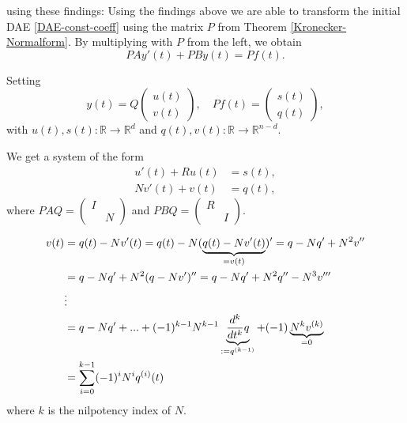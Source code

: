	\begin{frame}
		using these findings:
		Using the findings above we are able to transform the initial DAE \eqref{DAE-const-coeff} using the matrix $P$ from Theorem \ref{Kronecker-Normalform}. By multiplying with $P$ from the left, we obtain
		\begin{displaymath}
			P A y'(t) + P B y(t) = P f(t) .
		\end{displaymath}
		
		Setting
		\begin{displaymath}
			y(t) = Q
			\left(
			\begin{matrix}
				u(t) \\
				v(t)
			\end{matrix}  
			\right) 
			, \quad
			Pf(t) = 
			\left(
			\begin{matrix}
				s(t) \\
				q(t)
			\end{matrix}
			\right),
		\end{displaymath}
		with $u(t),s(t) : \mathbb{R} \to \mathbb{R}^d$ and $q(t),v(t) : \mathbb{R} \to \mathbb{R}^{n-d}$.
		
		We get a system of the form
		\begin{equation}
			\label{transformed-DAE-const-coeff}
			\begin{aligned}
				u'(t) + Ru(t) &= s(t), \\
				Nv'(t) + v(t) &= q(t),
			\end{aligned}
		\end{equation}
		where $PAQ = 
		\left( 
		\begin{matrix}
			I & \\
			& N
		\end{matrix} 
		\right)$
		and $PBQ = 
		\left( 
		\begin{matrix}
			R & \\
			& I
		\end{matrix} 
		\right)$.
	\end{frame}
	
	\begin{frame}
		\begin{align}
			\notag
			v(t) &= q(t) - Nv'(t) = q(t) - N(\underbrace{q(t)-Nv'(t)}_{=v(t)})' = q-Nq'+N^2v'' \\ \notag
			&= q-Nq'+N^2(q-Nv')'' = q-Nq'+N^2q''-N^3v''' \\ \notag
			&\vdots \\ \notag
			&= q-Nq'+...+(-1)^{k-1}N^{k-1}\underbrace{\frac{d^k}{dt^k}q}_{:=q^{(k-1)}}+(-1) \underbrace{N^kv^{(k)}}_{=0}\\ 
			\label{solution-to-transformed-DAE-const-coeff-part2}
			&= \sum_{i=0}^{k-1} (-1)^iN^iq^{(i)}(t)
		\end{align}
		where $k$ is the nilpotency index of $N$.
	\end{frame}


